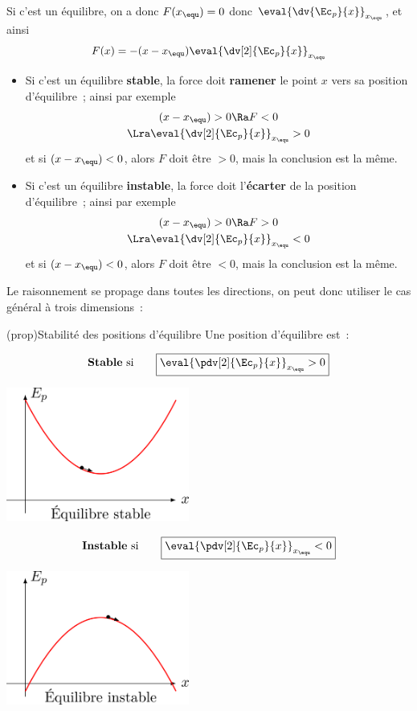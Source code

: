 \documentclass[../../main/main.tex]{subfiles}
\begin{document}
Si c'est un équilibre, on a donc $F(x_{\equ}) = 0$ donc
$\eval{\dv{\Ec_p}{x}}_{x_{\equ}}$, et ainsi
\[F(x) = -(x-x_{\equ}) \eval{\dv[2]{\Ec_p}{x}}_{x_{\equ}}\]

\begin{itemize}
	\item Si c'est un équilibre \textbf{stable}, la force doit \textbf{ramener}
	      le point $x$ vers sa position d'équilibre~; ainsi par exemple
	      \begin{gather*}
		      (x-x_{\equ}) > 0 \Ra F < 0
		      \\\Lra
		      \eval{\dv[2]{\Ec_p}{x}}_{x_{\equ}} > 0
	      \end{gather*}
	      et si $(x-x_{\equ}) < 0$, alors $F$ doit être $>0$, mais la conclusion
	      est la même.
	\item Si c'est un équilibre \textbf{instable}, la force doit
	      l'\textbf{écarter} de la position d'équilibre~; ainsi par exemple
	      \begin{gather*}
		      (x-x_{\equ}) > 0 \Ra F > 0
		      \\\Lra
		      \eval{\dv[2]{\Ec_p}{x}}_{x_{\equ}} < 0
	      \end{gather*}
	      et si $(x-x_{\equ}) < 0$, alors $F$ doit être $<0$, mais la conclusion
	      est la même.
\end{itemize}

Le raisonnement se propage dans toutes les directions, on peut donc utiliser le
cas général à trois dimensions~:

\begin{tcb*}(prop){Stabilité des positions d'équilibre}
	Une position d'équilibre est~:\\
	\begin{isd}
		\[\text{\textbf{Stable} si}
			\qquad
			\boxed{\eval{\pdv[2]{\Ec_p}{x}}_{x_{\equ}} > 0}\]
		\begin{center}
			\includegraphics[width=6cm]{stab_b}
		\end{center}
		\tcblower
		\[\text{\textbf{Instable} si}
			\qquad
			\boxed{\eval{\pdv[2]{\Ec_p}{x}}_{x_{\equ}} < 0}\]
		\begin{center}
			\includegraphics[width=6cm]{instab_b}
		\end{center}
	\end{isd}
\end{tcb*}
\end{document}
